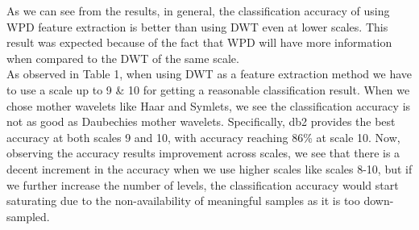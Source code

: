 \documentclass[10pt,twocolumn,letterpaper]{article}
\begin{document}
As we can see from the results, in general, the classification accuracy of using WPD feature extraction is better than using DWT even at lower scales. This result was expected because of the fact that WPD will have more information when compared to the DWT of the same scale. \\
As observed in Table 1, when using DWT as a feature extraction method we have to use a scale up to 9 \& 10 for getting a reasonable classification result. When we chose mother wavelets like Haar and Symlets, we see the classification accuracy is not as good as Daubechies mother wavelets. Specifically, db2 provides the best accuracy at both scales 9 and 10, with accuracy reaching 86\% at scale 10. Now, observing the accuracy results improvement across scales, we see that there is a decent increment in the accuracy when we use higher scales like scales 8-10, but if we further increase the number of levels, the classification accuracy would start saturating due to the non-availability of meaningful samples as it is too down-sampled.
\end{document}
